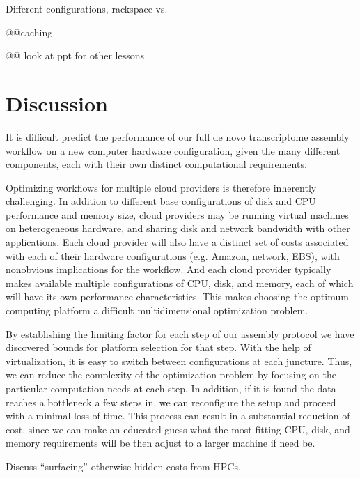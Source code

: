\documentclass[11pt]{article}
\begin{document}
Different configurations, rackspace vs.

@@caching

@@ look at ppt for other lessons

\section*{Discussion}

It is difficult predict the performance of our full de novo
transcriptome assembly workflow on a new computer hardware
configuration, given the many different components, each with
their own distinct computational requirements.  

Optimizing workflows for multiple cloud providers is therefore
inherently challenging.  In addition to different base configurations
of disk and CPU performance and memory size, cloud providers may be
running virtual machines on heterogeneous hardware, and sharing disk
and network bandwidth with other applications.  Each cloud provider
will also have a distinct set of costs associated with each of their
hardware configurations (e.g. Amazon, network, EBS), with nonobvious
implications for the workflow.  And each cloud provider typically
makes available multiple configurations of CPU, disk, and memory, each
of which will have its own performance characteristics.  This makes
choosing the optimum computing platform a difficult multidimensional
optimization problem.

By establishing the limiting factor for each step of our assembly protocol 
we have discovered bounds for platform selection for that step. With the help
of virtualization, it is easy to switch between configurations at each 
juncture. Thus, we can reduce the complexity of the optimization problem by 
focusing on the particular computation needs at each step. In addition, if it
is found the data reaches a bottleneck a few steps in, we can reconfigure the
setup and proceed with a minimal loss of time. This process can result in a 
substantial reduction of cost, since we can make an educated guess what the 
most fitting CPU, disk, and memory requirements will be then adjust to a larger
machine if need be.

Discuss ``surfacing'' otherwise hidden costs from HPCs.
\end{document}
